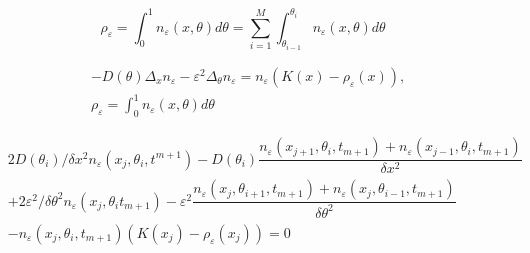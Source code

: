 \documentclass[preprint]{article}
\numberwithin{equation}{section}
\begin{document}
$$\rho_\varepsilon = \int_0^1n_\varepsilon(x,\theta) d\theta = \sum_{i=1}^M\int_{\theta_{i-1}}^{\theta_i} n_\varepsilon(x,\theta) d\theta$$

\newpage
\begin{equation}
\begin{aligned}
&-D(\theta)\Delta_x n_\varepsilon -\varepsilon^2\Delta_\theta n_\varepsilon = n_\varepsilon(K(x)-\rho_\varepsilon(x)),\\
&\rho_\varepsilon = \int_0^1n_\varepsilon(x,\theta) d\theta
\end{aligned}
\end{equation}

\begin{equation}
\begin{aligned}
&2D(\theta_i)/\delta x^2n_\varepsilon(x_j, \theta_i, t^{m+1}) - D(\theta_i)\dfrac{n_\varepsilon(x_{j+1}, \theta_i, t_{m+1})  + n_\varepsilon(x_{j-1}, \theta_i, t_{m+1})}{\delta x^2}\\
& + 2\varepsilon^2 /\delta \theta^2 n_\varepsilon(x_j,\theta_i t_{m+1})
-\varepsilon^2 \dfrac{n_\varepsilon(x_j, \theta_{i+1}, t_{m+1}) + n_\varepsilon(x_j, \theta_{i-1}, t_{m+1})}{\delta\theta^2} \\
& -n_\varepsilon(x_j, \theta_i, t_{m+1}) \left(K(x_j) - \rho_\varepsilon(x_j)\right) = 0
\end{aligned}
\end{equation}
\end{document}
